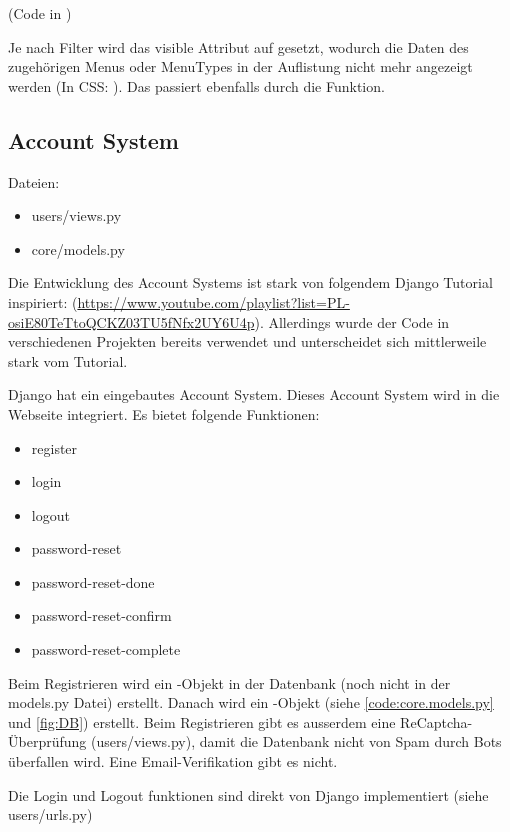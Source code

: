 (Code in )

Je nach Filter wird das visible Attribut auf  gesetzt, wodurch die
Daten des zugehörigen Menus oder MenuTypes in der Auflistung nicht mehr
angezeigt werden (In CSS: ). Das passiert ebenfalls durch
die  Funktion.

\newpage

\subsection{Account System} \label{spez:Account}

Dateien:
\begin{itemize}
    \item users/views.py
    \item core/models.py
\end{itemize}

Die Entwicklung des Account Systems ist stark von folgendem Django Tutorial
inspiriert:
(\url{https://www.youtube.com/playlist?list=PL-osiE80TeTtoQCKZ03TU5fNfx2UY6U4p}).
Allerdings wurde der Code in verschiedenen Projekten bereits verwendet und
unterscheidet sich mittlerweile stark vom Tutorial.

Django hat ein eingebautes Account System. Dieses Account System wird in die
Webseite integriert. Es bietet folgende Funktionen:
\begin{itemize}
    \item register
    \item login
    \item logout
    \item password-reset
    \item password-reset-done
    \item password-reset-confirm
    \item password-reset-complete
\end{itemize}

Beim Registrieren wird ein -Objekt in der Datenbank (noch nicht in
der models.py Datei) erstellt. Danach wird ein -Objekt (siehe
\ref{code:core.models.py} und \ref{fig:DB}) erstellt. Beim Registrieren gibt es
ausserdem eine ReCaptcha-Überprüfung (users/views.py), damit die Datenbank nicht
von Spam durch Bots überfallen wird. Eine Email-Verifikation gibt es nicht.

Die Login und Logout funktionen sind direkt von Django implementiert (siehe
users/urls.py)

